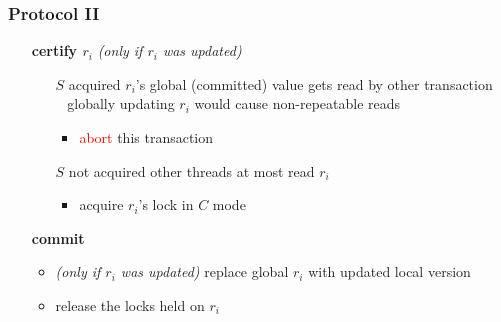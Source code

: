 \begin{frame}
	\frametitle{Protocol II}
	
	\begin{itemize}
		\item[\textbf{certify $r_i$}]	\textit{(only if $r_i$ was updated)}
							\begin{itemize}
								\item[$S$ acquired]	$r_i$'s global (committed) value gets read by other transaction \\ \bm{$\rightarrow$} globally updating $r_i$ would cause non-repeatable reads
															\begin{itemize}
																\item	\textcolor{red}{abort} this transaction
															\end{itemize}
								\item[$S$ not acquired]	other threads at most read $r_i$
															\begin{itemize}
																\item	acquire $r_i$'s lock in $C$ mode
															\end{itemize}
							\end{itemize}
		\item[\textbf{commit}]	\hfill
							\begin{itemize}
								\item	\textit{(only if $r_i$ was updated)} replace global $r_i$ with updated local version
								\item	release the locks held on $r_i$
							\end{itemize}
	\end{itemize}
\end{frame}


